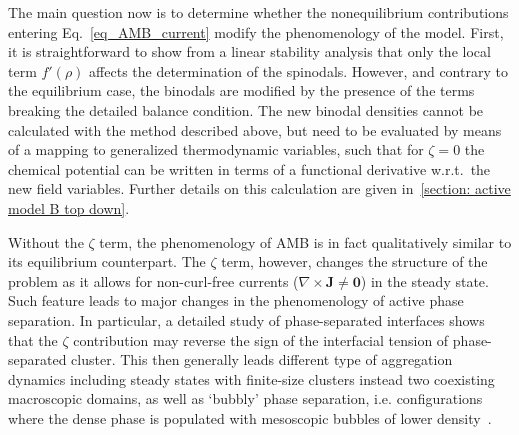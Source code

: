 The main question now is to determine whether the nonequilibrium contributions entering Eq.~\eqref{eq_AMB_current} modify the phenomenology of the model.
First, it is straightforward to show from a linear stability analysis that only the local term $f'(\rho)$ affects the determination of the spinodals.
However, and contrary to the equilibrium case, the binodals are modified by the presence of the terms breaking the detailed balance condition.
The new binodal densities cannot be calculated with the method described above, but need to be evaluated by means of a mapping to generalized thermodynamic variables, such that for $\zeta = 0$ the chemical potential can be written in terms of a functional derivative w.r.t.\ the new field variables.
Further details on this calculation are given in~\autoref{section: active model B top down}.

Without the $\zeta$ term, the phenomenology of AMB is in fact qualitatively similar to its equilibrium counterpart. 
The $\zeta$ term, however, changes the structure of the problem as it allows for non-curl-free currents ($\nabla \times \bm J \ne \bm 0$) in the steady state.
Such feature leads to major changes in the phenomenology of active phase separation.
In particular, a detailed study of phase-separated interfaces shows that the $\zeta$ contribution may reverse the sign of the interfacial tension of phase-separated cluster. 
This then generally leads different type of aggregation dynamics including steady states with finite-size clusters instead two coexisting macroscopic domains, as well as `bubbly' phase separation, i.e. configurations where the dense phase is populated with mesoscopic bubbles of lower density~\cite{Tjhung2018PRX}.





